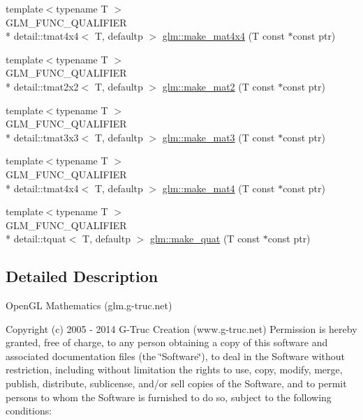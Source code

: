 \begin{DoxyCompactItemize}
\item 
{\footnotesize template$<$typename T $>$ }\\G\-L\-M\-\_\-\-F\-U\-N\-C\-\_\-\-Q\-U\-A\-L\-I\-F\-I\-E\-R \\*
detail\-::tmat4x4$<$ T, defaultp $>$ \hyperlink{group__gtc__type__ptr_ga4b13ff6840a66d032724a9a1db50f704}{glm\-::make\-\_\-mat4x4} (T const $\ast$const ptr)
\item 
{\footnotesize template$<$typename T $>$ }\\G\-L\-M\-\_\-\-F\-U\-N\-C\-\_\-\-Q\-U\-A\-L\-I\-F\-I\-E\-R \\*
detail\-::tmat2x2$<$ T, defaultp $>$ \hyperlink{group__gtc__type__ptr_ga903422b2c346cbaccad3153a5a1f404c}{glm\-::make\-\_\-mat2} (T const $\ast$const ptr)
\item 
{\footnotesize template$<$typename T $>$ }\\G\-L\-M\-\_\-\-F\-U\-N\-C\-\_\-\-Q\-U\-A\-L\-I\-F\-I\-E\-R \\*
detail\-::tmat3x3$<$ T, defaultp $>$ \hyperlink{group__gtc__type__ptr_gae50ecac46eb8771fb074e310b602bf53}{glm\-::make\-\_\-mat3} (T const $\ast$const ptr)
\item 
{\footnotesize template$<$typename T $>$ }\\G\-L\-M\-\_\-\-F\-U\-N\-C\-\_\-\-Q\-U\-A\-L\-I\-F\-I\-E\-R \\*
detail\-::tmat4x4$<$ T, defaultp $>$ \hyperlink{group__gtc__type__ptr_gac3920fd61f0c459a4749b8eb9107982c}{glm\-::make\-\_\-mat4} (T const $\ast$const ptr)
\item 
{\footnotesize template$<$typename T $>$ }\\G\-L\-M\-\_\-\-F\-U\-N\-C\-\_\-\-Q\-U\-A\-L\-I\-F\-I\-E\-R \\*
detail\-::tquat$<$ T, defaultp $>$ \hyperlink{group__gtc__type__ptr_ga051ec24a44af31a08b11eccbf8726b02}{glm\-::make\-\_\-quat} (T const $\ast$const ptr)
\end{DoxyCompactItemize}


\subsection{Detailed Description}
Open\-G\-L Mathematics (glm.\-g-\/truc.\-net)

Copyright (c) 2005 -\/ 2014 G-\/\-Truc Creation (www.\-g-\/truc.\-net) Permission is hereby granted, free of charge, to any person obtaining a copy of this software and associated documentation files (the \char`\"{}\-Software\char`\"{}), to deal in the Software without restriction, including without limitation the rights to use, copy, modify, merge, publish, distribute, sublicense, and/or sell copies of the Software, and to permit persons to whom the Software is furnished to do so, subject to the following conditions\-:

